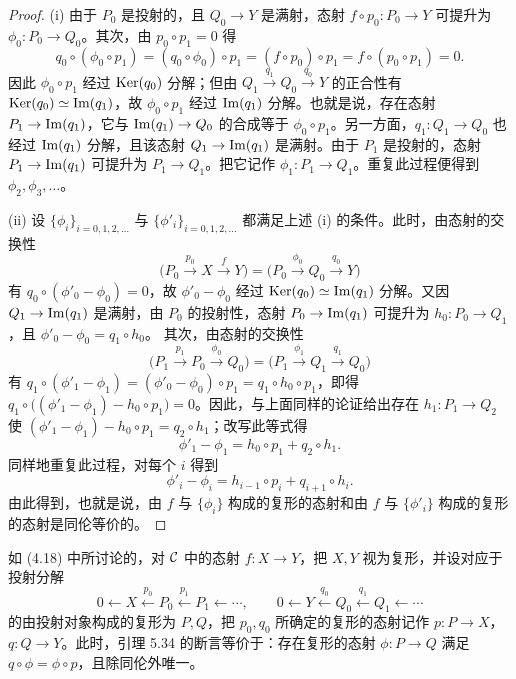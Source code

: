 \begin{proof}
(i) 由于 $P_0$ 是投射的，且 $Q_0\to Y$ 是满射，态射 $f\circ p_0\colon P_0\to Y$ 可提升为 $\phi_0\colon P_0\to Q_0$。其次，由 $p_0\circ p_1=0$ 得
\[
  q_0\circ(\phi_0\circ p_1)=(q_0\circ\phi_0)\circ p_1=(f\circ p_0)\circ p_1=f\circ(p_0\circ p_1)=0.
\]
因此 $\phi_0\circ p_1$ 经过 $\operatorname{Ker}(q_0)$ 分解；但由 $Q_1\xrightarrow{q_1}Q_0\xrightarrow{q_0}Y$ 的正合性有 $\operatorname{Ker}(q_0)\simeq\operatorname{Im}(q_1)$，故 $\phi_0\circ p_1$ 经过 $\operatorname{Im}(q_1)$ 分解。也就是说，存在态射 $P_1\to\operatorname{Im}(q_1)$，它与 $\operatorname{Im}(q_1)\to Q_0$ 的合成等于 $\phi_0\circ p_1$。另一方面，$q_1\colon Q_1\to Q_0$ 也经过 $\operatorname{Im}(q_1)$ 分解，且该态射 $Q_1\to\operatorname{Im}(q_1)$ 是满射。由于 $P_1$ 是投射的，态射 $P_1\to\operatorname{Im}(q_1)$ 可提升为 $P_1\to Q_1$。把它记作 $\phi_1\colon P_1\to Q_1$。重复此过程便得到 $\phi_2,\phi_3,\ldots$。

(ii) 设 $\{\phi_i\}_{i=0,1,2,\ldots}$ 与 $\{\phi'_i\}_{i=0,1,2,\ldots}$ 都满足上述 (i) 的条件。此时，由态射的交换性
\[
  \bigl(P_0\xrightarrow{p_0}X\xrightarrow{f}Y\bigr)
  =\bigl(P_0\xrightarrow{\phi_0}Q_0\xrightarrow{q_0}Y\bigr)
\]
有 $q_0\circ(\phi'_0-\phi_0)=0$，故 $\phi'_0-\phi_0$ 经过 $\operatorname{Ker}(q_0)\simeq\operatorname{Im}(q_1)$ 分解。又因 $Q_1\to\operatorname{Im}(q_1)$ 是满射，由 $P_0$ 的投射性，态射 $P_0\to\operatorname{Im}(q_1)$ 可提升为 $h_0\colon P_0\to Q_1$，且 $\phi'_0-\phi_0=q_1\circ h_0$。
其次，由态射的交换性
\[
  \bigl(P_1\xrightarrow{p_1}P_0\xrightarrow{\phi_0}Q_0\bigr)
  =\bigl(P_1\xrightarrow{\phi_1}Q_1\xrightarrow{q_1}Q_0\bigr)
\]
有 $q_1\circ(\phi'_1-\phi_1)=(\phi'_0-\phi_0)\circ p_1=q_1\circ h_0\circ p_1$，即得 $q_1\circ\bigl((\phi'_1-\phi_1)-h_0\circ p_1\bigr)=0$。因此，与上面同样的论证给出存在 $h_1\colon P_1\to Q_2$ 使 $(\phi'_1-\phi_1)-h_0\circ p_1=q_2\circ h_1$；改写此等式得
\[
  \phi'_1-\phi_1=h_0\circ p_1+q_2\circ h_1.
\]
同样地重复此过程，对每个 $i$ 得到
\[
  \phi'_i-\phi_i=h_{i-1}\circ p_i+q_{i+1}\circ h_i.
\]
由此得到，也就是说，由 $f$ 与 $\{\phi_i\}$ 构成的复形的态射和由 $f$ 与 $\{\phi'_i\}$ 构成的复形的态射是同伦等价的。
\end{proof}


如 (4.18) 中所讨论的，对 $\mathcal{C}$ 中的态射 $f\colon X\to Y$，把 $X, Y$ 视为复形，并设对应于投射分解
\[
  0\leftarrow X\xleftarrow{p_0}P_0\xleftarrow{p_1}P_1\leftarrow\cdots,\qquad
  0\leftarrow Y\xleftarrow{q_0}Q_0\xleftarrow{q_1}Q_1\leftarrow\cdots
\]
的由投射对象构成的复形为 $P, Q$，把 $p_0, q_0$ 所确定的复形的态射记作 $p\colon P\to X$，$q\colon Q\to Y$。此时，引理 5.34 的断言等价于：存在复形的态射 $\phi\colon P\to Q$ 满足 $q\circ\phi=\phi\circ p$，且除同伦外唯一。

